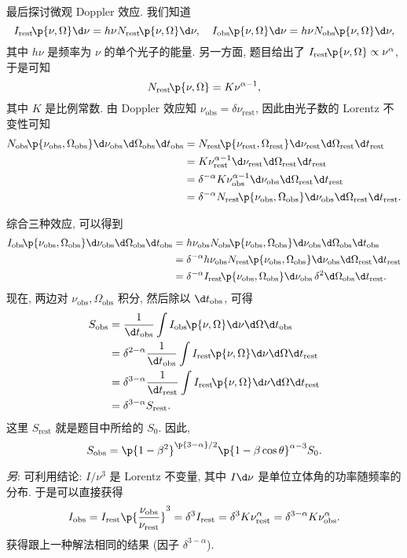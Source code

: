 \documentclass{article}
\newcommand{\mrm}[1]{\mathrm{#1}}
\newcommand{\tit}[1]{\textit{#1}}
\newcommand{\alp}{\alpha}
\newcommand{\dlt}{\delta}
\newcommand{\tht}{\theta}
\newcommand{\Omg}{\Omega}
\newcommand{\fr}{\frac}
\newcommand{\fc}[2]{#1\mathchoice{\!}{\!}{}{}\p{#2}} %
\begin{document}
最后探讨微观 Doppler 效应.
我们知道
\[\fc{I_\mrm{rest}}{\nu,\Omg}\d\nu=h\nu\fc{N_\mrm{rest}}{\nu,\Omg}\d\nu,\quad
\fc{I_\mrm{obs}}{\nu,\Omg}\d\nu=h\nu\fc{N_\mrm{obs}}{\nu,\Omg}\d\nu,\]
其中 $h\nu$ 是频率为 $\nu$ 的单个光子的能量.
另一方面, 题目给出了 $\fc{I_\mrm{rest}}{\nu,\Omg}\propto\nu^\alp$, 于是可知
\[\fc{N_\mrm{rest}}{\nu,\Omg}=K\nu^{\alp-1},\]
其中 $K$ 是比例常数.
由 Doppler 效应知 $\nu_\mrm{obs}=\dlt\nu_\mrm{rest}$, 因此由光子数的 Lorentz 不变性可知
\begin{align*}
	\fc{N_\mrm{obs}}{\nu_\mrm{obs},\Omg_\mrm{obs}}\d\nu_\mrm{obs}\d\Omg_\mrm{obs}\d t_\mrm{obs}
	&=\fc{N_\mrm{rest}}{\nu_\mrm{rest},\Omg_\mrm{rest}}\d\nu_\mrm{rest}\d\Omg_\mrm{rest}\d t_\mrm{rest}\\
	&=K\nu_\mrm{rest}^{\alp-1}\d\nu_\mrm{rest}\d\Omg_\mrm{rest}\d t_\mrm{rest}\\
	&=\dlt^{-\alp}K\nu_\mrm{obs}^{\alp-1}\d\nu_\mrm{obs}\d\Omg_\mrm{rest}\d t_\mrm{rest}\\
	&=\dlt^{-\alp}\fc{N_\mrm{rest}}{\nu_\mrm{obs},\Omg_\mrm{obs}}\d\nu_\mrm{obs}\d\Omg_\mrm{rest}\d t_\mrm{rest}.
\end{align*}

综合三种效应, 可以得到
\begin{align*}
	\fc{I_\mrm{obs}}{\nu_\mrm{obs},\Omg_\mrm{obs}}\d\nu_\mrm{obs}\d\Omg_\mrm{obs}\d t_\mrm{obs}
	&=h\nu_\mrm{obs}\fc{N_\mrm{obs}}{\nu_\mrm{obs},\Omg_\mrm{obs}}\d\nu_\mrm{obs}\d\Omg_\mrm{obs}\d t_\mrm{obs}\\
	&=\dlt^{-\alp}h\nu_\mrm{obs}\fc{N_\mrm{rest}}{\nu_\mrm{obs},\Omg_\mrm{obs}}\d\nu_\mrm{obs}\d\Omg_\mrm{rest}\d t_\mrm{rest}\\
	&=\dlt^{-\alp}\fc{I_\mrm{rest}}{\nu_\mrm{obs},\Omg_\mrm{obs}}\d\nu_\mrm{obs}\,\dlt^2\d\Omg_\mrm{obs}\d t_\mrm{rest}.
\end{align*}
现在, 两边对 $\nu_\mrm{obs},\Omg_\mrm{obs}$ 积分, 然后除以 $\d t_\mrm{obs}$, 可得
\begin{align*}
	S_\mrm{obs}&=\fr1{\d t_\mrm{obs}}\int\fc{I_\mrm{obs}}{\nu,\Omg}\d\nu\d\Omg\d t_\mrm{obs}\\
	&=\dlt^{2-\alp}\fr1{\d t_\mrm{obs}}\int\fc{I_\mrm{rest}}{\nu,\Omg}\d\nu\d\Omg\d t_\mrm{rest}\\
	&=\dlt^{3-\alp}\fr1{\d t_\mrm{rest}}\int\fc{I_\mrm{rest}}{\nu,\Omg}\d\nu\d\Omg\d t_\mrm{rest}\\
	&=\dlt^{3-\alp}S_\mrm{rest}.
\end{align*}
这里 $S_\mrm{rest}$ 就是题目中所给的 $S_0$. 因此,
\[S_\mrm{obs}=\p{1-\beta^2}^{\p{3-\alp}/2}\p{1-\beta\cos\tht}^{\alp-3}S_0.\]

\tit{另}: 可利用结论: $I/\nu^3$ 是 Lorentz 不变量, 其中 $I\d\nu$ 是单位立体角的功率随频率的分布.
于是可以直接获得
\[I_\mrm{obs}=I_\mrm{rest}\p{\fr{\nu_\mrm{obs}}{\nu_\mrm{rest}}}^3
=\dlt^3I_\mrm{rest}=\dlt^3K\nu_\mrm{rest}^\alp=\dlt^{3-\alp}K\nu_\mrm{obs}^\alp.\]
获得跟上一种解法相同的结果 (因子 $\dlt^{3-\alp}$).
\end{document}
